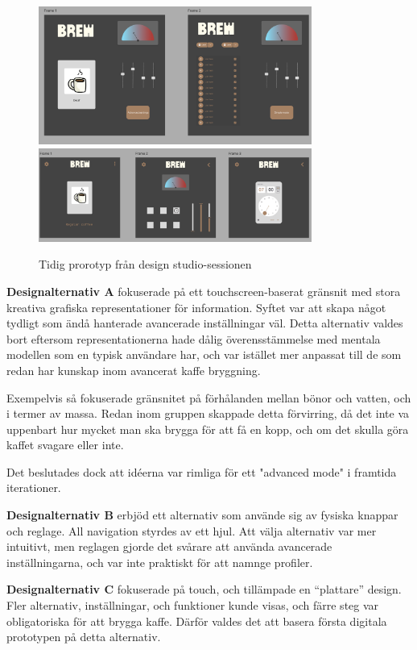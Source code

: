 \begin{figure}[H]
    \centering
    \includegraphics[width=0.8\textwidth]{bilder/sjov.png}
    \includegraphics[width=0.8\textwidth]{bilder/sjov2.png}
    \caption{Tidig prorotyp från design studio-sessionen}
    \label{fig:tidiga3}
\end{figure}

\textbf{Designalternativ A} fokuserade på ett touchscreen-baserat gränsnit med stora kreativa grafiska representationer för information. Syftet var att skapa något tydligt som ändå hanterade avancerade inställningar väl. Detta alternativ valdes bort eftersom representationerna hade dålig överensstämmelse med mentala modellen som en typisk användare har, och var istället mer anpassat till de som redan har kunskap inom avancerat kaffe bryggning.

Exempelvis så fokuserade gränsnitet på förhålanden mellan bönor och vatten, och i termer av massa. Redan inom gruppen skappade detta förvirring, då det inte va uppenbart hur mycket man ska brygga för att få en kopp, och om det skulla göra kaffet svagare eller inte.

Det beslutades dock att id\'eerna var rimliga för ett "advanced mode" i framtida iterationer.

\textbf{Designalternativ B} erbjöd ett alternativ som använde sig av fysiska knappar och reglage. All navigation styrdes av ett hjul. Att välja alternativ var mer intuitivt, men reglagen gjorde det svårare att använda avancerade inställningarna, och var inte praktiskt för att namnge profiler. 

\textbf{Designalternativ C} fokuserade på touch, och tillämpade en “plattare” design. Fler alternativ, inställningar, och funktioner kunde visas, och färre steg var obligatoriska för att brygga kaffe. Därför valdes det att basera första digitala prototypen på detta alternativ.
